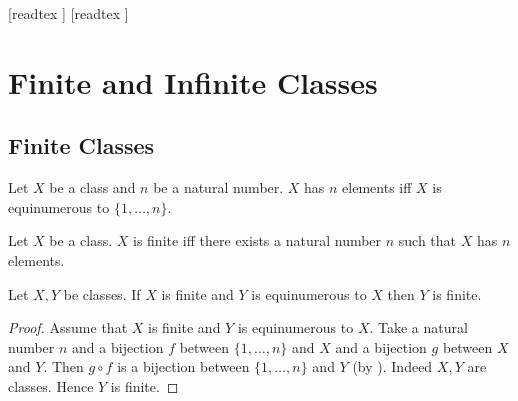 \documentclass[10pt]{article}
\begin{document}
  \begin{imports}
    \begin{forthel}
      [readtex ]
      [readtex ]
    \end{forthel}
  \end{imports}


  \section*{Finite and Infinite Classes}

  \subsection*{Finite Classes}

  \begin{forthel}
    \begin{definition}[id=FOUNDATIONS_14_3512046897512410,printid]
      Let $X$ be a class and $n$ be a natural number.
      $X$ has $n$ elements iff $X$ is equinumerous to $\{ 1, \dots, n \}$.
    \end{definition}
  \end{forthel}

  \begin{forthel}
    \begin{definition}[id=FOUNDATIONS_14_3694156977274880,printid]
      Let $X$ be a class.
      $X$ is finite iff there exists a natural number $n$ such that $X$ has $n$ elements.
    \end{definition}
  \end{forthel}

  \begin{forthel}
    \begin{proposition}[id=FOUNDATIONS_14_3929085203972096,printid]
      Let $X, Y$ be classes.
      If $X$ is finite and $Y$ is equinumerous to $X$ then $Y$ is finite.
    \end{proposition}
    \begin{proof}
      Assume that $X$ is finite and $Y$ is equinumerous to $X$.
      Take a natural number $n$ and a bijection $f$ between $\{ 1, \dots, n \}$ and $X$ and a bijection $g$ between $X$ and $Y$.
      Then $g \circ f$ is a bijection between $\{ 1, \dots, n \}$ and $Y$ (by ).
      Indeed $X, Y$ are classes.
      Hence $Y$ is finite.
    \end{proof}
  \end{forthel}
\end{document}

